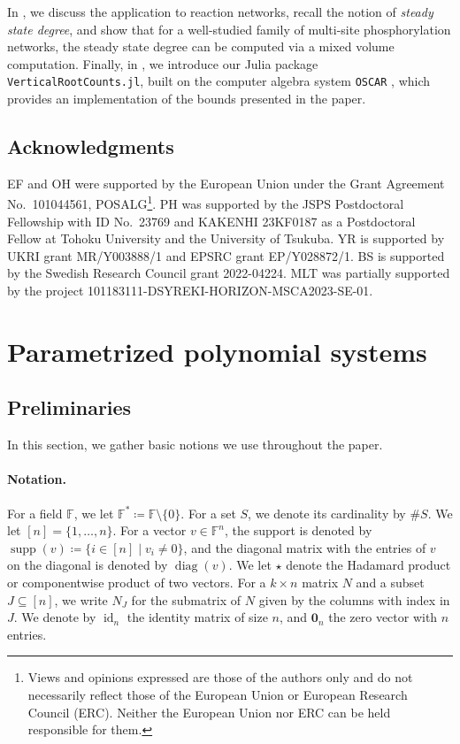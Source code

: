 \documentclass[11pt,reqno,a4paper]{amsart}
\numberwithin{equation}{section}
\theoremstyle{theoremstyle}
\theoremstyle{examplestyle}
\newcommand{\FF}{\mathbb{F}}
\DeclareMathOperator{\id}{id}
\DeclareMathOperator{\diag}{diag}
\DeclareMathOperator{\supp}{supp}
\begin{document}
\medskip

In , we discuss the application to reaction networks, recall the notion of \emph{steady state degree}, and show that for a well-studied family of multi-site phosphorylation networks, the steady state degree can be computed via a mixed volume computation.
Finally, in ,  we introduce our Julia package \texttt{VerticalRootCounts.jl}, built on the computer algebra system \texttt{OSCAR} \cite{OSCAR-book}, which provides an implementation of the bounds presented in the paper.


\subsection*{Acknowledgments}
EF and OH were supported by the European Union under the Grant Agreement No.\ 101044561, POSALG\footnote{\scriptsize Views and opinions expressed are those of the
authors only and do not necessarily reflect those of the European Union or European Research
Council (ERC). Neither the European Union nor ERC can be held responsible for them.}. 
PH was supported by the JSPS Postdoctoral Fellowship with ID No.\ 23769 and KAKENHI 23KF0187 as a Postdoctoral Fellow at Tohoku University and the University of Tsukuba. 
YR is supported by UKRI grant MR/Y003888/1 and EPSRC grant EP/Y028872/1.
BS is supported by the Swedish Research Council grant 2022-04224.  MLT was partially supported by the project 
101183111-DSYREKI-HORIZON-MSCA2023-SE-01. 

\section{Parametrized polynomial systems}
\label{sec:networks_and_vertical_systems}

\subsection{Preliminaries}\label{subsec:preliminaries}
In this section, we gather basic notions we use throughout the paper.

\smallskip
\paragraph{\bf Notation. }
For a field $\FF$, we let $\FF^*\coloneqq \FF \setminus \{0\}$. For a set $S$, we denote its cardinality by $\#S$. 
We let $[n]= \{1,\dots,n\}$.  For a vector $v\in \FF^n$, the support is denoted by $\supp(v)\coloneqq \{i\in [n] \mid v_i\neq 0\}$, and the diagonal matrix with the entries of $v$ on the diagonal is denoted by $\diag(v)$. We let $\star$ denote the Hadamard product or componentwise product of two vectors. 
For a $k\times n$ matrix $N$ and a subset $J \subseteq [n]$, we write $N_J$ for the submatrix of $N$ given by the columns with index in $J$. We denote by $\id_n$ the identity matrix of size $n$, and $\mathbf{0}_n$ the zero vector with $n$ entries.
\end{document}
